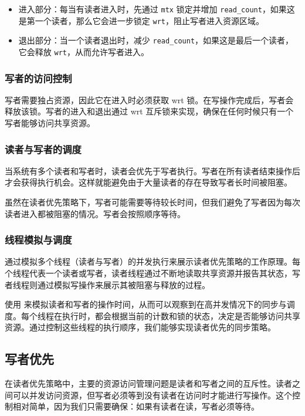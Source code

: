 \begin{itemize}
    \item 进入部分：每当有读者进入时，先通过 \texttt{mtx} 锁定并增加 \texttt{read\_count}，如果这是第一个读者，那么它会进一步锁定 \texttt{wrt}，阻止写者进入资源区域。
    \item 退出部分：当一个读者退出时，减少 \texttt{read\_count}，如果这是最后一个读者，它会释放 \texttt{wrt}，从而允许写者进入。
\end{itemize}

\subsubsection{写者的访问控制}

写者需要独占资源，因此它在进入时必须获取 wrt 锁。在写操作完成后，写者会释放该锁。写者的进入和退出通过 wrt 互斥锁来实现，确保在任何时候只有一个写者能够访问共享资源。

\subsubsection{读者与写者的调度}

当系统有多个读者和写者时，读者会优先于写者执行。写者在所有读者结束操作后才会获得执行机会。这样就能避免由于大量读者的存在导致写者长时间被阻塞。

虽然在读者优先策略下，写者可能需要等待较长时间，但我们避免了写者因为每次读者进入都被阻塞的情况。写者会按照顺序等待。

\subsubsection{线程模拟与调度}

通过模拟多个线程（读者与写者）的并发执行来展示读者优先策略的工作原理。每个线程代表一个读者或写者，读者线程通过不断地读取共享资源并报告其状态，写者线程则通过模拟写操作来展示其被阻塞与释放的过程。

使用  来模拟读者和写者的操作时间，从而可以观察到在高并发情况下的同步与调度。每个线程在执行时，都会根据当前的计数和锁的状态，决定是否能够访问共享资源。通过控制这些线程的执行顺序，我们能够实现读者优先的同步策略。

\subsection{写者优先}

在读者优先策略中，主要的资源访问管理问题是读者和写者之间的互斥性。读者之间可以并发访问资源，但写者必须等到没有读者在访问时才能进行写操作。这个控制相对简单，因为我们只需要确保：如果有读者在读，写者必须等待。

